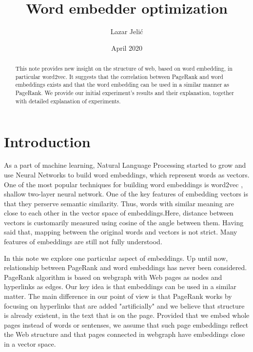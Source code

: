 \documentclass{article}
\title{Word embedder optimization}
\author{Lazar Jelić}
\date{April 2020}
\begin{document}
\maketitle

\begin{abstract}

	This note provides new insight on the structure of web, based on word embedding, in particular word2vec. It suggests that the correlation between PageRank and word embeddings exists and that the word embedding can be used in a similar manner as PageRank. We provide our initial experiment's results and their explanation, together with detailed explanation of experiments. 

\end{abstract}

\section{Introduction}

As a part of machine learning, Natural Language Processing started to grow and use Neural Networks to build word embeddings, which represent words as vectors. One of the most popular techniques for building word embeddings is word2vec \cite{word2vec}, shallow two-layer neural network. One of the key features of embedding vectors is that they perserve semantic similarity. Thus, words with similar meaning are close to each other in the vector space of embeddings.Here, distance between vectors is customarily measured using cosine of the angle between them. Having said that, mapping between the original words and vectors is not strict. Many features of embeddings are still not fully understood.\newline

In this note we explore one particular aspect of embeddings. Up until now, relationship between PageRank \cite{PageRank} and word embeddings has never been considered. PageRank algorithm is based on webgraph with Web pages as nodes and hyperlinks as edges. Our key idea is that embeddings can be used in a similar matter. The main difference in our point of view is that PageRank works by focusing on hyperlinks that are added "artificially" and we believe that structure is already existent, in the text that is on the page. Provided that we embed whole pages instead of words or sentenses, we assume that such page embeddings reflect the Web structure and that pages connected in webgraph have embeddings close in a vector space. 
\end{document}
